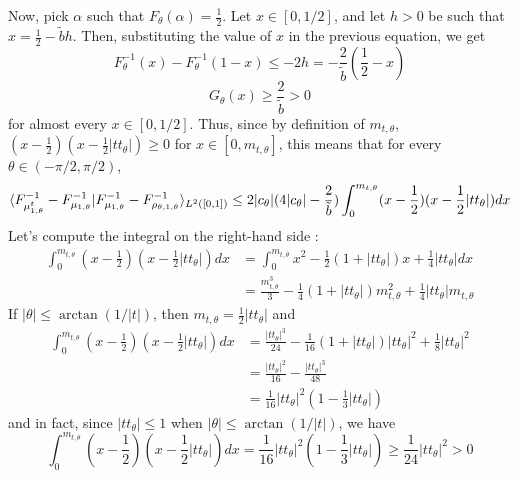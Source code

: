     Now, pick $\alpha$ such that $F_\theta(\alpha) = \frac{1}{2}$. Let $x \in [0,1/2]$, and let $h > 0$ be such that $x = \frac{1}{2} - \tilde{b}h$. Then, substituting the value of $x$ in the previous equation, we get
    \begin{equation} F^{-1}_\theta(x) - F^{-1}_\theta(1-x) \leq -2h = -\frac{2}{\tilde{b}}(\frac{1}{2} - x)\end{equation}
    \begin{equation} G_\theta(x) \geq \frac{2}{\tilde{b}} > 0\end{equation}
    for almost every $x \in [0,1/2]$. Thus, since by definition of $m_{t,\theta}$, $(x - \frac{1}{2})(x - \frac{1}{2}|tt_\theta|) \geq 0$ for $x \in [0, m_{t,\theta}]$, this means that for every $\theta \in (-\pi/2,\pi/2)$,
    \begin{equation}
         \label{eq:proof_l269} \langle F^{-1}_{\mu^t_{1,\theta}} - F^{-1}_{\mu_{1,\theta}}|F^{-1}_{\mu_{1,\theta}} - F^{-1}_{\rho_{\theta,1,\theta}}\rangle_{L^2([0,1])} 
        \leq 2|c_\theta|(4|c_\theta|-\frac{2}{\tilde{b}}) \int_0^{m_{t,\theta}} (x - \frac{1}{2})(x - \frac{1}{2}|tt_\theta|) dx
    \end{equation}
    Let's compute the integral on the right-hand side  :
    \begin{align}
        \int_0^{m_{t,\theta}} (x - \frac{1}{2})(x - \frac{1}{2}|tt_\theta|) dx
        &= \int_0^{m_{t,\theta}} x^2 - \frac{1}{2} (1+|tt_\theta|)x + \frac{1}{4} |tt_\theta| dx \\
        &= \frac{m_{t,\theta}^3}{3} - \frac{1}{4} (1 + |tt_\theta|)m_{t,\theta}^2 + \frac{1}{4} |tt_\theta| m_{t,\theta}
    \end{align}
    If $|\theta| \leq \arctan(1/|t|)$, then $m_{t,\theta} = \frac{1}{2} |tt_\theta|$ and 
    \begin{align}
        \int_0^{m_{t,\theta}} (x - \frac{1}{2})(x - \frac{1}{2}|tt_\theta|) dx
        &= \frac{|tt_\theta|^3}{24} - \frac{1}{16} (1 + |tt_\theta|)|tt_\theta|^2 + \frac{1}{8} |tt_\theta|^2 \\
        &= \frac{|tt_\theta|^2}{16} - \frac{|tt_\theta|^3}{48} \\
        &= \frac{1}{16}|tt_\theta|^2(1 - \frac{1}{3}|tt_\theta|)
    \end{align}
    and in fact, since $|tt_\theta| \leq 1$ when $|\theta| \leq \arctan(1/|t|)$, we have
    \begin{equation} \label{eq:proof_285}
        \int_0^{m_{t,\theta}} (x - \frac{1}{2})(x - \frac{1}{2}|tt_\theta|) dx = \frac{1}{16}|tt_\theta|^2(1 - \frac{1}{3}|tt_\theta|) \geq \frac{1}{24} |tt_\theta|^2 > 0
    \end{equation}
